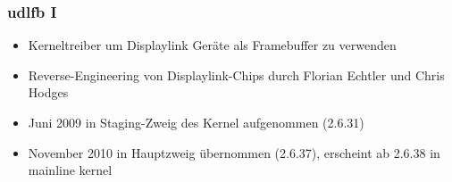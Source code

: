 \documentclass{beamer}
\begin{document}
	
	\begin{frame}
		\frametitle{udlfb I}
		\begin{itemize}
			\item Kerneltreiber um Displaylink Geräte als Framebuffer zu verwenden
			\item Reverse-Engineering von Displaylink-Chips durch Florian Echtler und Chris Hodges
			\item Juni 2009 in Staging-Zweig des Kernel aufgenommen (2.6.31)
			\item November 2010 in Hauptzweig übernommen (2.6.37), erscheint ab 2.6.38 in mainline kernel
		\end{itemize}
	\end{frame}	
\end{document}
